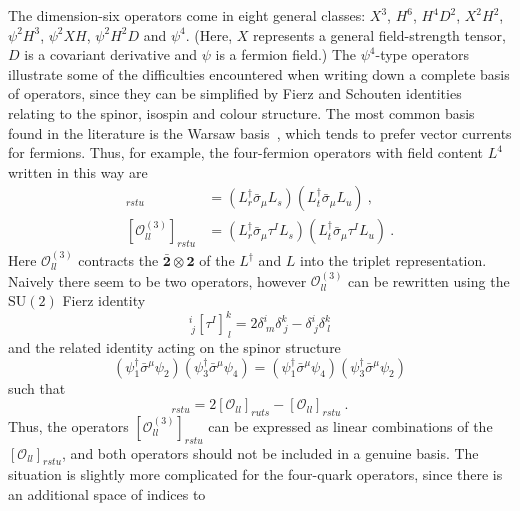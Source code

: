 The dimension-six operators come in eight general classes: $X^{3}$, $H^{6}$,
$H^{4}D^{2}$, $X^{2}H^{2}$, $\psi^{2}H^{3}$, $\psi^{2}XH$, $\psi^{2}H^{2}D$ and
$\psi^{4}$. (Here, $X$ represents a general field-strength tensor, $D$ is a
covariant derivative and $\psi$ is a fermion field.) The $\psi^{4}$-type
operators illustrate some of the difficulties encountered when writing down a
complete basis of operators, since they can be simplified by Fierz and Schouten
identities relating to the spinor, isospin and colour structure. The most common
basis found in the literature is the Warsaw basis~\cite{Buchmuller:1985jz,
  Grzadkowski:2010es}, which tends to prefer vector currents for fermions. Thus,
for example, the four-fermion operators with field content $L^{4}$ written in
this way are
\begin{align}
  [\mathcal{O}_{ll}]_{rstu} &= (L^{\dagger}_r \bar{\sigma}_{\mu} L_s) (L^{\dagger}_t \bar{\sigma}_{\mu} L_u) \ , \\
  [\mathcal{O}_{ll}^{(3)}]_{rstu} &= (L_r^{\dagger} \bar{\sigma}_{\mu} \tau^I L_s) (L_t^{\dagger} \bar{\sigma}_{\mu} \tau^I L_u) \ .
\end{align}
Here $\mathcal{O}_{ll}^{(3)}$ contracts the
$\bar{\mathbf{2}} \otimes \mathbf{2}$ of the $L^{\dagger}$ and $L$ into the
triplet representation. Naively there seem to be two operators, however
$\mathcal{O}_{ll}^{(3)}$ can be rewritten using the $\mathrm{SU}(2)$ Fierz
identity
\begin{equation}
  [\tau^{I}]^{i}_{\ j} [\tau^{I}]^{k}_{\ l} = 2\delta^{i}_{\ m} \delta^{k}_{\ j} - \delta^{i}_{\ j} \delta^{k}_{\ l}
\end{equation}
and the related identity acting on the spinor structure
\begin{equation}
  \label{eq:spinor-fierz}
  (\psi_{1}^{\dagger} \bar{\sigma}^{\mu} \psi_{2})  (\psi_{3}^{\dagger} \bar{\sigma}^{\mu} \psi_{4}) = (\psi_{1}^{\dagger} \bar{\sigma}^{\mu} \psi_{4})  (\psi_{3}^{\dagger} \bar{\sigma}^{\mu} \psi_{2})
\end{equation}
such that
\begin{equation}
  [\mathcal{O}_{ll}^{(3)}]_{rstu} = 2 [\mathcal{O}_{ll}]_{ruts} - [\mathcal{O}_{ll}]_{rstu} \ .
\end{equation}
Thus, the operators $[\mathcal{O}_{ll}^{(3)}]_{rstu}$ can be expressed as linear
combinations of the $[\mathcal{O}_{ll}]_{rstu}$, and both operators should not
be included in a genuine basis. The situation is slightly more complicated for
the four-quark operators, since there is an additional space of indices to
